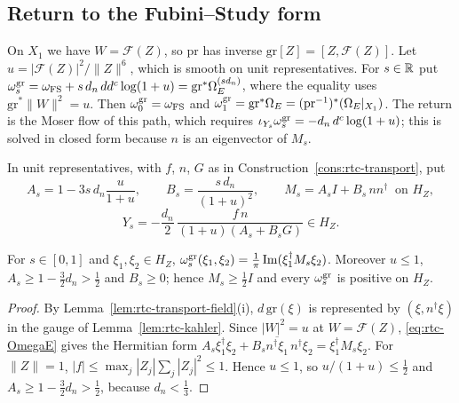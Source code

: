 \subsection{Return to the Fubini--Study form}\label{sec:rtc-return}

On $X_1$ we have $W=\mathcal F(Z)$, so $\mathrm{pr}$ has inverse $\mathrm{gr}[Z]=[Z,\mathcal F(Z)]$. Let $u=|\mathcal F(Z)|^2/\|Z\|^6$, which is smooth on unit representatives. For $s\in\mathbb{R}$ put $\omega^{\rm gr}_s=\omega_{\rm FS}+s\,d_n\,dd^c\log(1+u)=\mathrm{gr}^*\Omega_E^{(sd_n)}$, where the equality uses $\mathrm{gr}^*\|W\|^2=u$. Then $\omega^{\rm gr}_0=\omega_{\rm FS}$ and $\omega^{\rm gr}_1=\mathrm{gr}^*\Omega_E=(\mathrm{pr}^{-1})^*(\Omega_E|_{X_1})$. The return is the Moser flow of this path, which requires $\iota_{Y_s}\omega^{\rm gr}_s=-d_n\,d^c\log(1+u)$; this is solved in closed form because $n$ is an eigenvector of $M_s$.

\begin{construction}\label{cons:rtc-return}
In unit representatives, with $f$, $n$, $G$ as in Construction~\ref{cons:rtc-transport}, put
\[
 A_s=1-3s\,d_n\frac{u}{1+u},\qquad B_s=\frac{s\,d_n}{(1+u)^2},\qquad M_s=A_sI+B_s\,nn^\dagger\ \text{ on }H_Z,
\]
\begin{equation}\label{eq:rtc-return-field}
 Y_s=-\frac{d_n}{2}\,\frac{f\,n}{(1+u)(A_s+B_sG)}\in H_Z .
\end{equation}
\end{construction}

\begin{lemma}\label{lem:rtc-graph}
For $s\in[0,1]$ and $\xi_1,\xi_2\in H_Z$, $\omega^{\rm gr}_s(\xi_1,\xi_2)=\frac1\pi\operatorname{Im}(\xi_1^\dagger M_s\xi_2)$. Moreover
$u\le1$, $A_s\ge1-\frac32d_n>\frac12$ and $B_s\ge0$; hence $M_s\ge\frac12I$ and every $\omega^{\rm gr}_s$ is positive on $H_Z$.
\end{lemma}

\begin{proof}
By Lemma~\ref{lem:rtc-transport-field}(i), $d\,\mathrm{gr}(\xi)$ is represented by $(\xi,n^\dagger\xi)$ in the gauge of Lemma~\ref{lem:rtc-kahler}. Since $|W|^2=u$ at $W=\mathcal F(Z)$, \eqref{eq:rtc-OmegaE} gives the Hermitian form $A_s\xi_1^\dagger\xi_2+B_s\overline{n^\dagger\xi_1}\,n^\dagger\xi_2=\xi_1^\dagger M_s\xi_2$. For $\|Z\|=1$, $|f|\le\max_j|Z_j|\sum_j|Z_j|^2\le1$. Hence $u\le1$, so $u/(1+u)\le\frac12$ and $A_s\ge1-\frac32d_n>\frac12$, because $d_n<\frac13$.
\end{proof}

